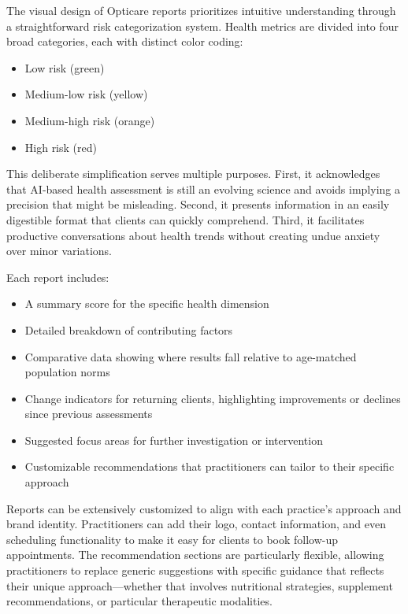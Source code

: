\documentclass[
  Letterpaper,
]{scrbook}
\providecommand{\tightlist}{%
  \setlength{\itemsep}{0pt}\setlength{\parskip}{0pt}}\usepackage{longtable,booktabs,array}
\begin{document}
The visual design of Opticare reports prioritizes intuitive
understanding through a straightforward risk categorization system.
Health metrics are divided into four broad categories, each with
distinct color coding:

\begin{itemize}
\tightlist
\item
  Low risk (green)
\item
  Medium-low risk (yellow)
\item
  Medium-high risk (orange)
\item
  High risk (red)
\end{itemize}

This deliberate simplification serves multiple purposes. First, it
acknowledges that AI-based health assessment is still an evolving
science and avoids implying a precision that might be misleading.
Second, it presents information in an easily digestible format that
clients can quickly comprehend. Third, it facilitates productive
conversations about health trends without creating undue anxiety over
minor variations.

Each report includes:

\begin{itemize}
\tightlist
\item
  A summary score for the specific health dimension
\item
  Detailed breakdown of contributing factors
\item
  Comparative data showing where results fall relative to age-matched
  population norms
\item
  Change indicators for returning clients, highlighting improvements or
  declines since previous assessments
\item
  Suggested focus areas for further investigation or intervention
\item
  Customizable recommendations that practitioners can tailor to their
  specific approach
\end{itemize}

Reports can be extensively customized to align with each practice's
approach and brand identity. Practitioners can add their logo, contact
information, and even scheduling functionality to make it easy for
clients to book follow-up appointments. The recommendation sections are
particularly flexible, allowing practitioners to replace generic
suggestions with specific guidance that reflects their unique
approach---whether that involves nutritional strategies, supplement
recommendations, or particular therapeutic modalities.
\end{document}
